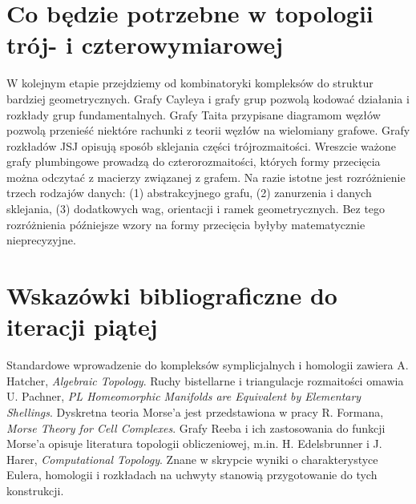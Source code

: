 \section{Co będzie potrzebne w topologii trój- i czterowymiarowej}
\label{sec:tg-roadmap-topology}

\begin{uwaga}
W kolejnym etapie przejdziemy od kombinatoryki
kompleksów do struktur bardziej geometrycznych.
Grafy Cayleya i grafy grup pozwolą kodować działania
i rozkłady grup fundamentalnych. Grafy Taita
przypisane diagramom węzłów pozwolą przenieść
niektóre rachunki z teorii węzłów na wielomiany grafowe.
Grafy rozkładów JSJ opisują sposób sklejania części
trójrozmaitości. Wreszcie ważone grafy plumbingowe
prowadzą do czterorozmaitości, których formy przecięcia
można odczytać z macierzy związanej z grafem.
Na razie istotne jest rozróżnienie trzech rodzajów danych:
(1) abstrakcyjnego grafu, (2) zanurzenia i danych sklejania,
(3) dodatkowych wag, orientacji i ramek geometrycznych.
Bez tego rozróżnienia późniejsze wzory na formy przecięcia
byłyby matematycznie nieprecyzyjne.
\end{uwaga}

\section*{Wskazówki bibliograficzne do iteracji piątej}
Standardowe wprowadzenie do kompleksów symplicjalnych i
homologii zawiera A. Hatcher, \emph{Algebraic Topology}.
Ruchy bistellarne i triangulacje rozmaitości omawia
U. Pachner, \emph{PL Homeomorphic Manifolds are Equivalent
by Elementary Shellings}.
Dyskretna teoria Morse'a jest przedstawiona w pracy
R. Formana, \emph{Morse Theory for Cell Complexes}.
Grafy Reeba i ich zastosowania do funkcji Morse'a
opisuje literatura topologii obliczeniowej, m.in.
H. Edelsbrunner i J. Harer, \emph{Computational Topology}.
Znane w skrypcie wyniki o charakterystyce Eulera,
homologii i rozkładach na uchwyty stanowią
przygotowanie do tych konstrukcji.


